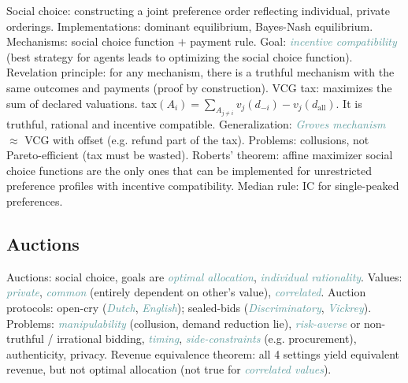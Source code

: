 \documentclass[10pt,a4paper,landscape]{article}
\newcommand{\concept}[1]{\textcolor{Emerald}{#1}} %
\newcommand{\subconcept}[1]{\textcolor{CadetBlue}{\textit{#1}}}
\begin{document}
\begin{multicols*}{4}
\concept{Social choice}: constructing a joint preference order reflecting individual, private orderings. Implementations: dominant equilibrium, Bayes-Nash equilibrium.
\concept{Mechanisms}: social choice function $+$ payment rule. Goal: \subconcept{incentive compatibility} (best strategy for agents leads to optimizing the social choice function).
\concept{Revelation principle}: for any mechanism, there is a truthful mechanism with the same outcomes and payments (proof by construction).
\concept{VCG tax}: maximizes the sum of declared valuations. $\text{tax}(A_i) = \sum_{A_{j \neq i}} v_j(d_{-i}) - v_j(d_{\text{all}})$. It is truthful, rational and incentive compatible. Generalization: \subconcept{Groves mechanism} $\approx$ VCG with offset (e.g. refund part of the tax). Problems: collusions, not Pareto-efficient (tax must be wasted).
\concept{Roberts' theorem}: affine maximizer social choice functions are the only ones that can be implemented for unrestricted preference profiles with incentive compatibility.
\concept{Median rule}: IC for single-peaked preferences.

\subsection{Auctions}

\concept{Auctions}: social choice, goals are \subconcept{optimal allocation}, \subconcept{individual rationality}.
\concept{Values}: \subconcept{private}, \subconcept{common} (entirely dependent on other's value), \subconcept{correlated}.
\concept{Auction protocols}: open-cry (\subconcept{Dutch}, \subconcept{English}); sealed-bids (\subconcept{Discriminatory}, \subconcept{Vickrey}). Problems: \subconcept{manipulability} (collusion, demand reduction lie), \subconcept{risk-averse} or non-truthful / irrational bidding, \subconcept{timing}, \subconcept{side-constraints} (e.g. procurement), authenticity, privacy.
\concept{Revenue equivalence theorem}: all 4 settings yield equivalent revenue, but not optimal allocation (not true for \subconcept{correlated values}).


\end{multicols*}
\end{document}
